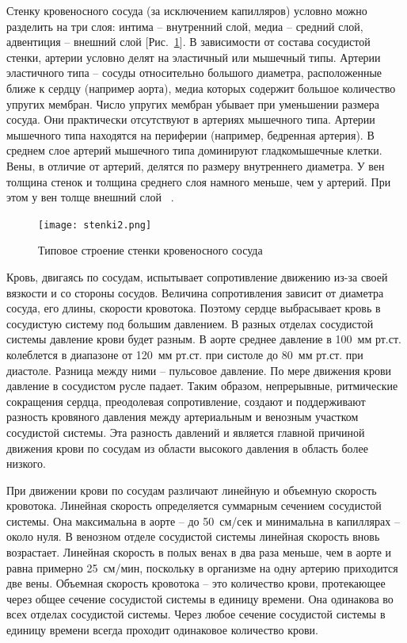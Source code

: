 Стенку кровеносного сосуда (за исключением капилляров) условно можно разделить на три слоя: интима -- внутренний слой, 
медиа -- средний слой, адвентиция -- внешний слой [Рис.~\ref{tip}].
В зависимости от состава сосудистой стенки, артерии условно делят на эластичный или мышечный типы. 
Артерии эластичного типа -- сосуды относительно большого диаметра, расположенные ближе к сердцу (например аорта), 
медиа которых содержит большое количество упругих мембран. Число упругих мембран убывает при уменьшении размера сосуда. 
Они практически отсутствуют в артериях мышечного типа. Артерии мышечного типа находятся на периферии (например, бедренная артерия). 
В среднем слое артерий мышечного типа доминируют гладкомышечные клетки. Вены, в отличие от артерий, делятся по размеру внутреннего 
диаметра. У вен толщина стенок и толщина среднего слоя намного меньше, чем у артерий. При этом у вен толще внешний слой ~\cite{Rhodin:1980}. 


\begin{figure}[h]
\centering
\texttt{[image: stenki2.png]}
\caption{Типовое строение стенки кровеносного сосуда ~\cite{blausen:2014}}
\label{tip}
\end{figure}

Кровь, двигаясь по сосудам, испытывает сопротивление движению из-за своей вязкости и со стороны сосудов. 
Величина сопротивления зависит от диаметра сосуда, его длины, скорости кровотока. Поэтому сердце выбрасывает кровь 
в сосудистую систему под большим давлением. В разных отделах сосудистой системы давление крови будет разным. 
В аорте среднее давление в 100~мм рт.ст. колеблется в диапазоне от 120~мм рт.ст. при систоле до 80~мм рт.ст. при диастоле. 
Разница между ними -- пульсовое давление. По мере движения крови давление в сосудистом русле падает. Таким образом, непрерывные, 
ритмические сокращения сердца, преодолевая сопротивление, создают и поддерживают разность кровяного давления между артериальным и 
венозным участком сосудистой системы. Эта разность давлений и является главной причиной движения крови по сосудам из области высокого 
давления в область более низкого.

При движении крови по сосудам различают линейную и объемную скорость кровотока. Линейная скорость определяется суммарным 
сечением сосудистой системы. Она максимальна в аорте -- до 50~см/сек и минимальна в капиллярах -- около нуля. 
В венозном отделе сосудистой системы линейная скорость вновь возрастает. Линейная скорость в полых венах в два раза меньше, 
чем в аорте и равна примерно 25~см/мин, поскольку в организме на одну артерию приходится две вены. 
Объемная скорость кровотока -- это количество крови, протекающее через общее сечение сосудистой системы в единицу времени. 
Она одинакова во всех отделах сосудистой системы. Через любое сечение сосудистой системы в единицу времени всегда проходит 
одинаковое количество крови.

